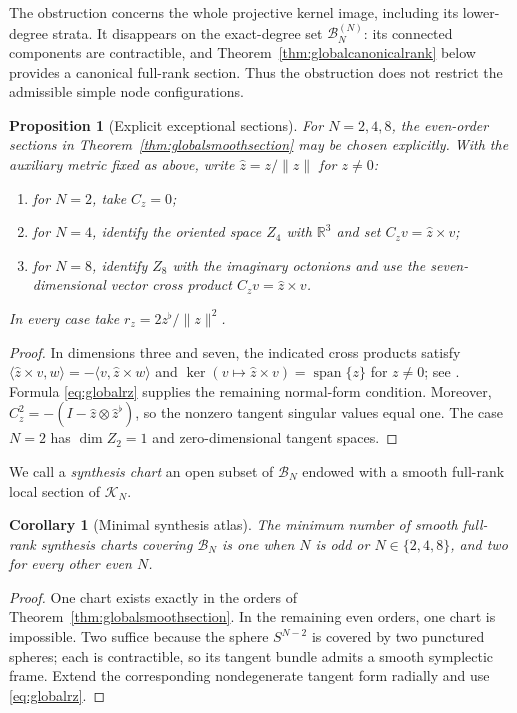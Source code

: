 \documentclass[11pt,a4paper]{article}
\newtheorem{proposition}[theorem]{Proposition}
\newtheorem{corollary}[theorem]{Corollary}
\theoremstyle{definition}
\theoremstyle{remark}
\newcommand{\R}{\mathbb{R}}
\newcommand{\Ker}{\operatorname{ker}}
\newcommand{\spanof}{\operatorname{span}}
\newcommand{\cB}{\mathcal{B}}
\newcommand{\cK}{\mathcal{K}}
\begin{document}
The obstruction concerns the whole projective kernel image, including its lower-degree
strata.  It disappears on the exact-degree set $\cB_N^{(N)}$: its connected components are
contractible, and Theorem~\ref{thm:globalcanonicalrank} below provides a canonical full-rank
section.  Thus the obstruction does not restrict the admissible simple node configurations.

\begin{proposition}[Explicit exceptional sections]\label{prop:exceptionalsections}
For $N=2,4,8$, the even-order sections in Theorem~\ref{thm:globalsmoothsection} may be chosen
explicitly.  With the auxiliary metric fixed as above, write
$\widehat z=z/\lVert z\rVert$ for $z\ne0$:
\begin{enumerate}
\item for $N=2$, take $C_z=0$;
\item for $N=4$, identify the oriented space $Z_4$ with $\R^3$ and set
      $C_zv=\widehat z\times v$;
\item for $N=8$, identify $Z_8$ with the imaginary octonions and use the seven-dimensional
      vector cross product $C_zv=\widehat z\times v$.
\end{enumerate}
In every case take $r_z=2z^\flat/\|z\|^2$.
\end{proposition}

\begin{proof}
In dimensions three and seven, the indicated cross products satisfy
$\langle \widehat z\times v,w\rangle=-\langle v,\widehat z\times w\rangle$ and
$\Ker(v\mapsto\widehat z\times v)=\spanof\{z\}$ for $z\neq0$; see
\cite{browngray1967,baez2002}.  Formula \eqref{eq:globalrz} supplies the remaining normal-form
condition.  Moreover, $C_z^2=-(I-\widehat z\otimes\widehat z^\flat)$, so the nonzero tangent
singular values equal one.  The case $N=2$ has $\dim Z_2=1$ and zero-dimensional tangent
spaces.
\end{proof}

We call a \emph{synthesis chart} an open subset of $\cB_N$ endowed with a smooth full-rank
local section of $\cK_N$.

\begin{corollary}[Minimal synthesis atlas]\label{cor:minimalatlas}
The minimum number of smooth full-rank synthesis charts covering $\cB_N$ is one when $N$ is
odd or $N\in\{2,4,8\}$, and two for every other even $N$.
\end{corollary}

\begin{proof}
One chart exists exactly in the orders of Theorem~\ref{thm:globalsmoothsection}.  In the
remaining even orders, one chart is impossible.  Two suffice because the sphere
$S^{N-2}$ is covered by two punctured spheres; each is contractible, so its tangent bundle
admits a smooth symplectic frame.  Extend the corresponding nondegenerate tangent form
radially and use \eqref{eq:globalrz}.
\end{proof}
\end{document}
